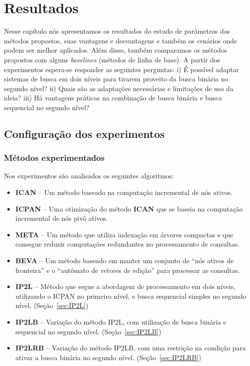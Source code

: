 \chapter{Resultados}
\label{sec:results}

Nesse capítulo nós apresentamos os resultados do estudo de parâmetros dos métodos propostos, suas vantagens e desvantagens e também os cenários onde podem ser melhor aplicados. Além disso, também comparamos os métodos propostos com alguns \textit{baselines} (métodos de linha de base). A partir dos experimentos espera-se responder as seguintes perguntas: i) É possível adaptar sistemas de busca em dois níveis para tirarem proveito da busca binária no segundo nível? ii) Quais são as adaptações necessárias e limitações de uso da ideia? iii) Há vantagens práticas na combinação de busca binária e busca sequencial no segundo nível?

\section{Configuração dos experimentos}
\label{sec:experiments-setup}

\subsection{Métodos experimentados}
Nos experimentos são analisados os seguintes algoritmos:
\begin{itemize}
    \item \textbf{ICAN} -- Um método baseado na computação incremental de nós ativos. \citep{ji2009efficient}
    \item \textbf{ICPAN} -- Uma otimização do método \textbf{ICAN} que se baseia na computação incremental de nós pivô ativos. \citep{li2011efficient}
    \item \textbf{META} -- Um método que utiliza indexação em árvores compactas e que consegue reduzir computações redundantes no processamento de consultas. \citep{deng2016meta}
    \item \textbf{BEVA} -- Um método baseado em manter um conjunto de ``nós ativos de fronteira'' e o ``autômato de vetores de edição'' para processar as consultas. \citep{zhou2016beva}
    \item \textbf{IP2L} -- Método que segue a abordagem de processamento em dois níveis, utilizando o ICPAN no primeiro nível, e busca sequencial simples no segundo nível. (Seção~\ref{sec:IP2L})
    \item \textbf{IP2LB} -- Variação do método IP2L, com utilização de busca binária e sequencial no segundo nível. (Seção~\ref{sec:IP2LB})
    \item \textbf{IP2LRB} -- Variação do método IP2LB, com uma restrição na condição para ativar a busca binária no segundo nível. (Seção~\ref{sec:IP2LRB})
\end{itemize}

